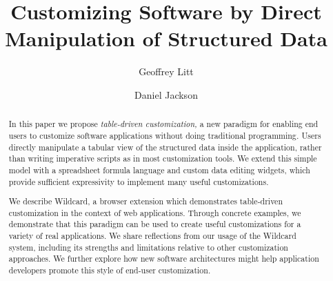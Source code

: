 \documentclass[sigplan,10pt,anonymous,review]{acmart}
\begin{document}
\title{Customizing Software by Direct Manipulation of Structured Data}


\author{Geoffrey Litt}

\author{Daniel Jackson}


\begin{abstract}
  In this paper we propose \emph{table-driven customization,} a new
  paradigm for enabling end users to customize software applications
  without doing traditional programming\emph{.} Users directly
  manipulate a tabular view of the structured data inside the
  application, rather than writing imperative scripts as in most
  customization tools. We extend this simple model with a spreadsheet
  formula language and custom data editing widgets, which provide
  sufficient expressivity to implement many useful customizations.

  We describe Wildcard, a browser extension which demonstrates
  table-driven customization in the context of web applications. Through
  concrete examples, we demonstrate that this paradigm can be used to
  create useful customizations for a variety of real applications. We
  share reflections from our usage of the Wildcard system, including its
  strengths and limitations relative to other customization approaches.
  We further explore how new software architectures might help
  application developers promote this style of end-user customization.
\end{abstract}
\end{document}
